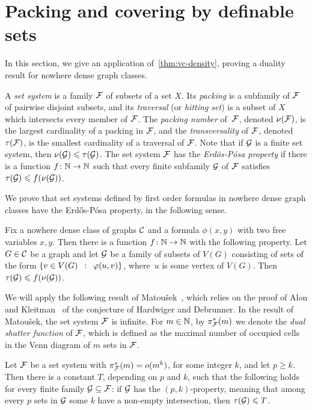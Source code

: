 \section{Packing and covering by definable sets}
In this section, we give an application 
of~\cref{thm:vc-density}, proving a 
duality result for nowhere dense graph classes.

A \emph{set system} is a family  $\cal F$ of subsets of a set $X$.
Its  \emph{packing} is a subfamily of $\cal F$ of pairwise disjoint subsets, and its \emph{traversal} (or \emph{hitting set}) is a subset of $X$ which intersects every member of $\cal F$.
The \emph{packing number} of~$\cal F$, denoted $\nu(\cal F)$, is the largest cardinality of a packing in $\cal F$,
and the \emph{transversality} of $\cal F$, denoted
$\tau(\cal F)$, is the smallest cardinality of a traversal of $\cal F$.
Note that if $\cal G$ is a finite set system, then
$\nu({\cal G})\le \tau(\cal G)$. 
The set system $\cal F$ has the \emph{Erd{\"o}s-Pósa property} if there is a function $f\from\N\to\N$ such that every finite subfamily $\cal G$ of $\cal F$
satisfies $\tau({\cal G})\le f(\nu(\cal G))$. 

We prove that set systems defined by first order formulas in nowhere dense graph classes have the Erd{\H o}s-P{\'o}sa property, in the following sense.

\begin{theorem}\label{thm:erdos-posa}
	Fix a nowhere dense class of graphs $\CCC$ and a 
	formula $\phi(x,y)$ with two free variables $x,y$.
	Then there is a function $f\from \N\to\N$ with the following property.
	Let $G\in \CCC$ be a graph and let $\cal G$
	be a family of subsets of $V(G)$ consisting of sets of the form $\setof{v\in V(G)}{\phi(u, v)}$, where~$u$ is some vertex of $V(G)$.
Then~$\tau({\cal G})\le f(\nu(\cal G))$.
\end{theorem}

We will apply the following result of Matou{\v s}ek~\cite{Matousek:2004:BVI:1005787.1005789},
which relies on the proof of Alon and Kleitman~\cite{alon-kleitman} of the conjecture of Hardwiger and Debrunner. 
In the result of Matou{\v s}ek, the set system $\cal F$ is infinite. For $m\in \N$, by $\pi_{\cal F}^*(m)$ we denote the \emph{dual shatter function} of $\cal F$, which is defined as the maximal number 
of occupied cells in the Venn diagram of $m$ sets in $\cal F$.

\begin{theorem}\label{thm:pq}
	Let $\cal F$ be a set system with $\pi^*_{\cal F}(m)=o(m^k)$,
	for some integer $k$, and let $p\ge k$.
	Then there is a constant $T$, depending on $p$ and $k$, such that the following holds for every finite family $\cal G\subset \cal F$: 
	if $\cal G$ has the $(p,k)$-property, meaning that 
	among every $p$ sets in $\cal G$ some $k$ have a non-empty intersection, then $\tau ({\cal G})\le T$.
\end{theorem}

